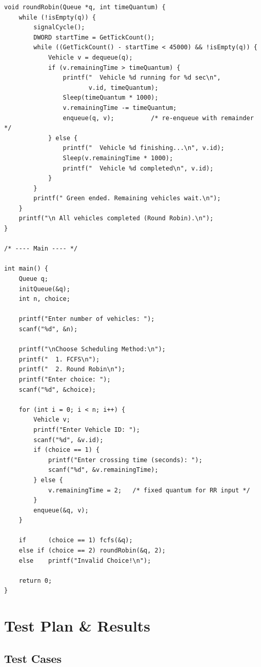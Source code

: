 \documentclass[12pt,a4paper]{article}
\begin{document}
\begin{lstlisting}[caption={Traffic Signal Simulation -- Full C Source}, label={lst:fullcode}]
void roundRobin(Queue *q, int timeQuantum) {
    while (!isEmpty(q)) {
        signalCycle();
        DWORD startTime = GetTickCount();
        while ((GetTickCount() - startTime < 45000) && !isEmpty(q)) {
            Vehicle v = dequeue(q);
            if (v.remainingTime > timeQuantum) {
                printf("  Vehicle %d running for %d sec\n",
                       v.id, timeQuantum);
                Sleep(timeQuantum * 1000);
                v.remainingTime -= timeQuantum;
                enqueue(q, v);          /* re-enqueue with remainder */
            } else {
                printf("  Vehicle %d finishing...\n", v.id);
                Sleep(v.remainingTime * 1000);
                printf("  Vehicle %d completed\n", v.id);
            }
        }
        printf(" Green ended. Remaining vehicles wait.\n");
    }
    printf("\n All vehicles completed (Round Robin).\n");
}

/* ---- Main ---- */

int main() {
    Queue q;
    initQueue(&q);
    int n, choice;

    printf("Enter number of vehicles: ");
    scanf("%d", &n);

    printf("\nChoose Scheduling Method:\n");
    printf("  1. FCFS\n");
    printf("  2. Round Robin\n");
    printf("Enter choice: ");
    scanf("%d", &choice);

    for (int i = 0; i < n; i++) {
        Vehicle v;
        printf("Enter Vehicle ID: ");
        scanf("%d", &v.id);
        if (choice == 1) {
            printf("Enter crossing time (seconds): ");
            scanf("%d", &v.remainingTime);
        } else {
            v.remainingTime = 2;   /* fixed quantum for RR input */
        }
        enqueue(&q, v);
    }

    if      (choice == 1) fcfs(&q);
    else if (choice == 2) roundRobin(&q, 2);
    else    printf("Invalid Choice!\n");

    return 0;
}
\end{lstlisting}

\newpage

\section{Test Plan \& Results}

\subsection{Test Cases}
\end{document}
